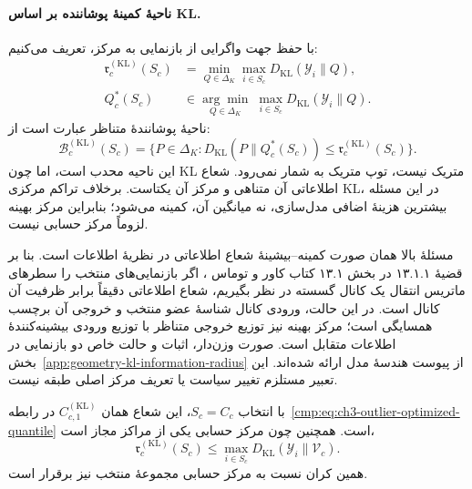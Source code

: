 \paragraph{ناحیهٔ کمینهٔ پوشاننده بر اساس KL.}
با حفظ جهت واگرایی از بازنمایی به مرکز، تعریف می‌کنیم:
\begin{equation}\label{cmp:eq:ch3-kl-enclosing-region}
\boxed{\begin{aligned}
\mathfrak r_c^{(\mathrm{KL})}(S_c)
&=\min_{Q\in\Delta_K}
\max_{i\in S_c}D_{\mathrm{KL}}(\mathscr Y_i\|Q),\\
Q_c^*(S_c)
&\in\underset{Q\in\Delta_K}{\arg\min}\;
\max_{i\in S_c}D_{\mathrm{KL}}(\mathscr Y_i\|Q).
\end{aligned}}
\end{equation}
ناحیهٔ پوشانندهٔ متناظر عبارت است از:
\begin{equation}\label{cmp:eq:ch3-kl-enclosing-set}
\mathcal B_c^{(\mathrm{KL})}(S_c)=
\{P\in\Delta_K:
D_{\mathrm{KL}}(P\|Q_c^*(S_c))
\le\mathfrak r_c^{(\mathrm{KL})}(S_c)\}.
\end{equation}
این ناحیه محدب است، اما چون KL متریک نیست،
توپ متریک به شمار نمی‌رود. شعاع اطلاعاتی آن
متناهی و مرکز آن یکتاست. برخلاف تراکم مرکزی KL،
در این مسئله بیشترین هزینهٔ اضافی مدل‌سازی، نه
میانگین آن، کمینه می‌شود؛ بنابراین مرکز بهینه
لزوماً مرکز حسابی نیست.

مسئلهٔ بالا همان صورت کمینه--بیشینهٔ شعاع اطلاعاتی
در نظریهٔ اطلاعات است. بنا بر قضیهٔ ۱۳.۱.۱ در
بخش ۱۳.۱ کتاب کاور و توماس \cite{CoverThomas2006}،
اگر بازنمایی‌های منتخب را سطرهای ماتریس انتقال
یک کانال گسسته در نظر بگیریم، شعاع اطلاعاتی دقیقاً
برابر ظرفیت آن کانال است. در این حالت، ورودی کانال
شناسهٔ عضو منتخب و خروجی آن برچسب همسایگی است؛
مرکز بهینه نیز توزیع خروجی متناظر با توزیع ورودی
بیشینه‌کنندهٔ اطلاعات متقابل است. صورت وزن‌دار،
اثبات و حالت خاص دو بازنمایی در
بخش~\ref{app:geometry-kl-information-radius} از پیوست
هندسهٔ مدل ارائه شده‌اند. این تعبیر مستلزم تغییر
سیاست یا تعریف مرکز اصلی طبقه نیست.

با انتخاب $S_c=C_c$، این شعاع همان
$C_{c,1}^{(\mathrm{KL})}$ در
رابطه~\eqref{cmp:eq:ch3-outlier-optimized-quantile} است.
همچنین چون مرکز حسابی یکی از مراکز مجاز است،
\begin{equation}\label{cmp:eq:ch3-kl-enclosing-fixed-bound}
\mathfrak r_c^{(\mathrm{KL})}(S_c)
\le\max_{i\in S_c}D_{\mathrm{KL}}(\mathscr Y_i\|\mathcal V_c).
\end{equation}
همین کران نسبت به مرکز حسابی مجموعهٔ منتخب نیز برقرار است.

